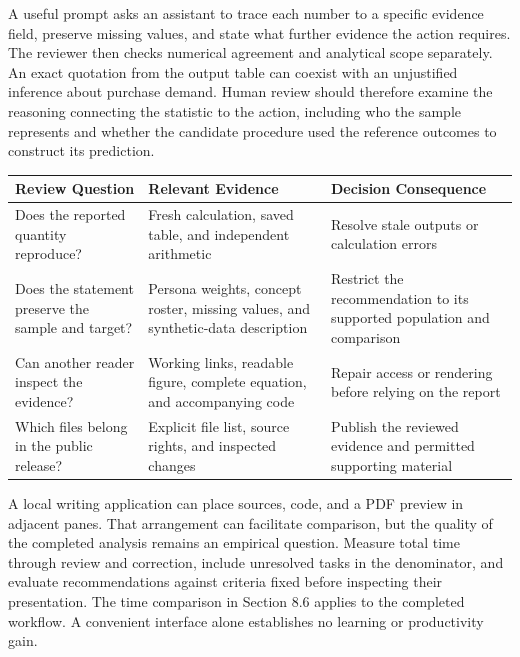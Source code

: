 A useful prompt asks an assistant to trace each number to a specific
evidence field, preserve missing values, and state what further evidence
the action requires. The reviewer then checks numerical agreement and
analytical scope separately. An exact quotation from the output table
can coexist with an unjustified inference about purchase demand. Human
review should therefore examine the reasoning connecting the statistic
to the action, including who the sample represents and whether the
candidate procedure used the reference outcomes to construct its
prediction.

\begin{table}[H]
\centering\small
\begin{tabular}{@{}
  >{\raggedright\arraybackslash}p{}
  >{\raggedright\arraybackslash}p{}
  >{\raggedright\arraybackslash}p{}@{}}
\toprule
Review Question & Relevant Evidence & Decision Consequence \\
\midrule

Does the reported quantity reproduce? & Fresh calculation, saved table,
and independent arithmetic & Resolve stale outputs or calculation
errors \\
Does the statement preserve the sample and target? & Persona weights,
concept roster, missing values, and synthetic-data description &
Restrict the recommendation to its supported population and
comparison \\
Can another reader inspect the evidence? & Working links, readable
figure, complete equation, and accompanying code & Repair access or
rendering before relying on the report \\
Which files belong in the public release? & Explicit file list, source
rights, and inspected changes & Publish the reviewed evidence and
permitted supporting material \\
\bottomrule
\end{tabular}
\end{table}

A local writing application can place sources, code, and a PDF preview
in adjacent panes. That arrangement can facilitate comparison, but the
quality of the completed analysis remains an empirical question. Measure
total time through review and correction, include unresolved tasks in
the denominator, and evaluate recommendations against criteria fixed
before inspecting their presentation. The time comparison in Section 8.6
applies to the completed workflow. A convenient interface alone
establishes no learning or productivity gain.

